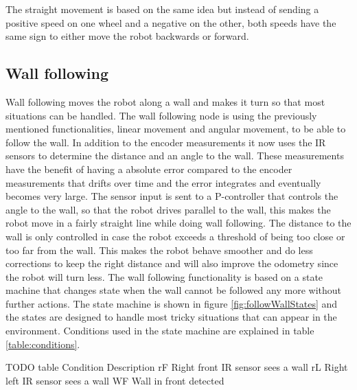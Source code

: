 The straight movement is based on the same idea but instead of sending a positive speed on one wheel and a negative on the other, both speeds have the same sign to either move the robot backwards or forward. 

\subsection{Wall following}

Wall following moves the robot along a wall and makes it turn so that most situations can be handled. The wall following node is using the previously mentioned functionalities, linear movement and angular movement, to be able to follow the wall. In addition to the encoder measurements it now uses the IR sensors to determine the distance and an angle to the wall. These measurements have the benefit of having a absolute error compared to the encoder measurements that drifts over time and the error integrates and eventually becomes very large.
	The sensor input is sent to a P-controller that controls the angle to the wall, so that the robot drives parallel to the wall, this makes the robot move in a fairly straight line while doing wall following. The distance to the wall is only controlled in case the robot exceeds a threshold of being too close or too far from the wall. This makes the robot behave smoother and do less corrections to keep the right distance and will also improve the odometry since the robot will turn less.
	The wall following functionality is based on a state machine that changes state when the wall cannot be followed any more without further actions. The state machine is shown in figure  \ref{fig:followWallStates} and the states are designed to handle most tricky situations that can appear in the environment. Conditions used in the state machine are explained in table \ref{table:conditions}.

TODO table
Condition	Description
rF	Right front IR sensor sees a wall
rL	Right left IR sensor sees a wall
WF	Wall in front detected


